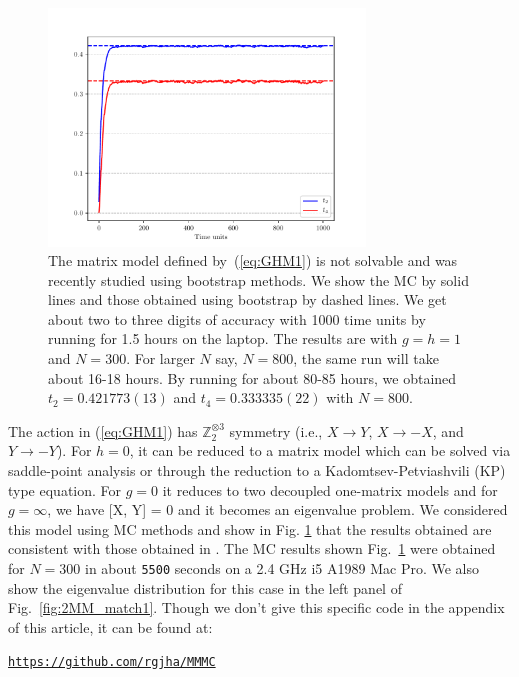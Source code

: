 \documentclass[11pt]{article}
\begin{document}
\begin{figure}[htbp] 
	\centering 
	\includegraphics[width=0.75\textwidth]{figs/plot_2MM_sym1.pdf}
	\caption{\label{fig:2MM_match}The matrix model defined by~(\ref{eq:GHM1}) is not solvable and was 
recently studied using bootstrap methods. We show the MC by solid lines and those 
obtained using bootstrap by dashed lines. We get about two to three digits of accuracy with 1000 time units 
by running for 1.5 hours on the laptop. The results are with $g=h=1$ and $N=300$. For larger $N$ say, $N=800$, 
the same run will take about 16-18 hours. By running for about 80-85 hours, we obtained 
$t_{2} = 0.421773(13) $ and $t_{4}=0.333335(22)$ with $N=800$.}
\end{figure} 

The action in (\ref{eq:GHM1}) has $\mathbb{Z}_{2}^{\otimes 3}$ symmetry 
(i.e., $X \to Y$, $X \to -X$, and $Y \to -Y$). For $h = 0$, it can be reduced to a
matrix model which can be solved via saddle-point analysis or through the reduction 
to a Kadomtsev-Petviashvili (KP) type equation. 
For $g = 0$ it reduces to two decoupled one-matrix models 
and for $g = \infty$, we have [X, Y] = 0 and it becomes an eigenvalue problem. 
We considered this model using MC methods and show in Fig. \ref{fig:2MM_match} that the results 
obtained are consistent with those obtained in \cite{Kazakov:2021lel}. 
The MC results shown Fig.~\ref{fig:2MM_match} 
were obtained for $N = 300$ in about \texttt{5500} seconds on a 2.4 GHz i5 A1989 Mac Pro. 
We also show the eigenvalue distribution for this case in the left panel of Fig.~\ref{fig:2MM_match1}. 
Though we don't give this specific code in the appendix of this article, it can be found at: 
\begin{center} \texttt{\href{https://github.com/rgjha/MMMC}{https://github.com/rgjha/MMMC}} \end{center}
\end{document}
